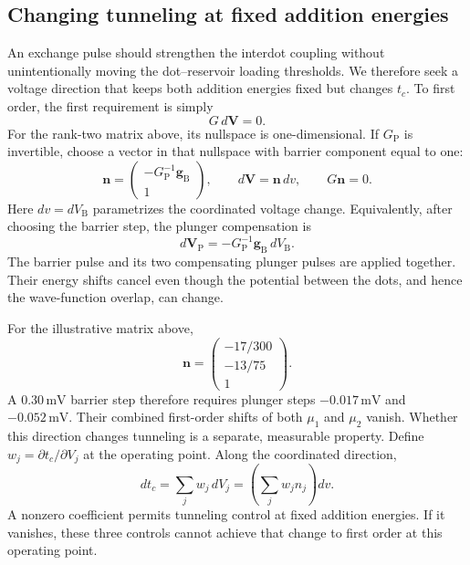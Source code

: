 \subsection{Changing tunneling at fixed addition energies}

An exchange pulse should strengthen the interdot coupling without
unintentionally moving the dot--reservoir loading thresholds.
We therefore seek a voltage direction that keeps both addition
energies fixed but changes $t_c$. To first order, the first
requirement is simply
\begin{equation}
 G\,d\mathbf V=0.
 \label{eq:calibration-fixed-energy-nullspace}
\end{equation}
For the rank-two matrix above, its nullspace is one-dimensional.
If $G_{\mathrm P}$ is invertible, choose a vector in that
nullspace with barrier component equal to one:
\begin{equation}
 \mathbf n=
 \begin{pmatrix}-G_{\mathrm P}^{-1}\mathbf g_{\mathrm B}\\1\end{pmatrix},
 \qquad
 d\mathbf V=\mathbf n\,dv,\qquad G\mathbf n=0.
 \label{eq:calibration-null-direction}
\end{equation}
Here $dv=dV_{\mathrm B}$ parametrizes the coordinated voltage
change. Equivalently, after choosing the barrier step, the
plunger compensation is
\begin{equation}
 d\mathbf V_{\mathrm P}
 =-G_{\mathrm P}^{-1}\mathbf g_{\mathrm B}\,dV_{\mathrm B}.
 \label{eq:calibration-barrier-compensation}
\end{equation}
The barrier pulse and its two compensating plunger pulses are
applied together. Their energy shifts cancel even though the
potential between the dots, and hence the wave-function overlap,
can change.

For the illustrative matrix above,
\[
 \mathbf n=
 \begin{pmatrix}-17/300\\-13/75\\1\end{pmatrix}.
\]
A $0.30\,\mathrm{mV}$ barrier step therefore requires plunger
steps $-0.017\,\mathrm{mV}$ and $-0.052\,\mathrm{mV}$.
Their combined first-order shifts of both $\mu_1$ and $\mu_2$
vanish. Whether this direction changes tunneling is a separate,
measurable property. Define
$w_j=\partial t_c/\partial V_j$ at the operating point.
Along the coordinated direction,
\begin{equation}
 dt_c=\sum_j w_j\,dV_j
     =\left(\sum_j w_j n_j\right)dv.
 \label{eq:calibration-tunneling-direction}
\end{equation}
A nonzero coefficient permits tunneling control at fixed addition
energies. If it vanishes, these three controls cannot achieve
that change to first order at this operating point.

